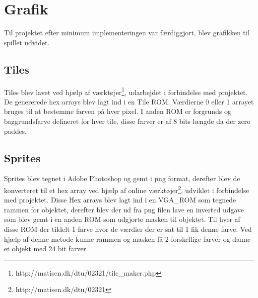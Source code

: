 \section{Grafik}
Til projektet efter minimum implementeringen var færdiggjort, blev grafikken til spillet udvidet. 


\subsection{Tiles}
Tiles blev lavet ved hjælp af værktøjer\footnote{http://matisen.dk/dtu/02321/tile\_maker.php}, udarbejdet i forbindelse med projektet. De genererede hex arrays blev lagt ind i en Tile ROM. Værdierne 0 eller 1 arrayet bruges til at bestemme farven på hver pixel. I anden ROM er forgrunds og baggrundsfarve defineret for hver tile, disse farver er af 8 bits længde da der zero paddes.

\subsection{Sprites}
Sprites blev tegnet i Adobe Photoshop og gemt i png format, derefter blev de konverteret til et hex array ved hjælp af online værktøjer\footnote{http://matisen.dk/dtu/02321}, udviklet i forbindelse med projektet. Disse Hex arrays blev lagt ind i en VGA\_ROM som tegnede rammen for objektet, derefter blev der ud fra png filen lave en inverted udgave som blev gemt i en anden ROM som udgjorte masken til objektet. Til hver af disse ROM der tildelt 1 farve hvor de værdier der er sat til 1 fik denne farve. Ved hjælp af denne metode kunne rammen og masken få 2 forskellige farver og danne et objekt med 24 bit farver.